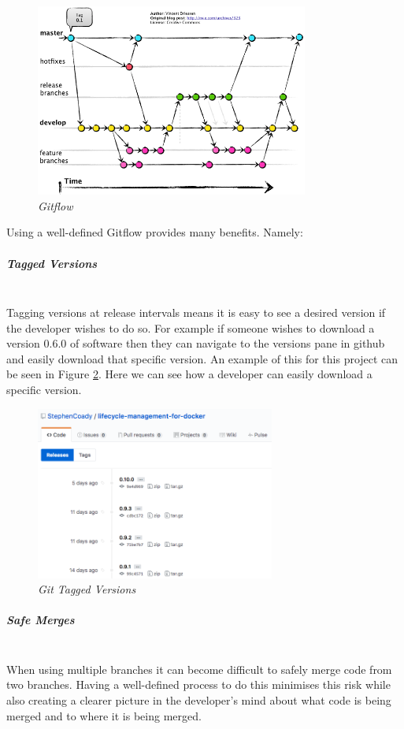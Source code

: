 \begin{figure}[!ht]
\centering
\includegraphics*[width=0.8\textwidth]{images/gitflow}
\caption{\em Gitflow \citep{Driessen2010}}
\label{fig:gitflow}
\end{figure}

Using a well-defined Gitflow provides many benefits. Namely:

\subparagraph{Tagged Versions}\mbox{}\\
Tagging versions at release intervals means it is easy to see a desired version if the developer wishes to do so. For example if someone wishes to download a version 0.6.0 of software then they can navigate to the versions pane in \gls{github} and easily download that specific version. An example of this for this project can be seen in Figure \ref{fig:git_tags}. Here we can see how a developer can easily download a specific version.

\begin{figure}[!ht]
\centering
\includegraphics*[width=0.7\textwidth]{images/git_tags}
\caption{\em Git Tagged Versions}
\label{fig:git_tags}
\end{figure}

\subparagraph{Safe Merges}\mbox{}\\
When using multiple branches it can become difficult to safely merge code from two branches. Having a well-defined process to do this minimises this risk while also creating a clearer picture in the developer's mind about what code is being merged and to where it is being merged.

